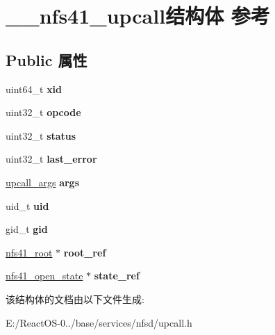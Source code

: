 \hypertarget{struct____nfs41__upcall}{}\section{\+\_\+\+\_\+nfs41\+\_\+upcall结构体 参考}
\label{struct____nfs41__upcall}
\subsection*{Public 属性}
\begin{DoxyCompactItemize}
\item 
\mbox{\label{struct____nfs41__upcall_ae69618353b07348ce9cd6065fea962a0}} 
uint64\+\_\+t {\bfseries xid}
\item 
\mbox{\label{struct____nfs41__upcall_ae81d7c243c723f4bc5918a72c860e406}} 
uint32\+\_\+t {\bfseries opcode}
\item 
\mbox{\label{struct____nfs41__upcall_a2c6587d8f6c9c4abd32bc2030bc5f8d6}} 
uint32\+\_\+t {\bfseries status}
\item 
\mbox{\label{struct____nfs41__upcall_aa3d42b20bdc8bcd6f9b02652b7d15b30}} 
uint32\+\_\+t {\bfseries last\+\_\+error}
\item 
\mbox{\label{struct____nfs41__upcall_aa1aa4310477283057506cd8ce6b94333}} 
\hyperlink{union____upcall__args}{upcall\+\_\+args} {\bfseries args}
\item 
\mbox{\label{struct____nfs41__upcall_a9da1b01f1009e8d5caf9be02a5bed235}} 
uid\+\_\+t {\bfseries uid}
\item 
\mbox{\label{struct____nfs41__upcall_af55446c65773be4422d396e74a7135f8}} 
gid\+\_\+t {\bfseries gid}
\item 
\mbox{\label{struct____nfs41__upcall_a818de6dcc6f2a9f9f7da653b77752d6a}} 
\hyperlink{struct____nfs41__root}{nfs41\+\_\+root} $\ast$ {\bfseries root\+\_\+ref}
\item 
\mbox{\label{struct____nfs41__upcall_a45f2c6f4723ed558b350bfe3bcd6dd6b}} 
\hyperlink{struct____nfs41__open__state}{nfs41\+\_\+open\+\_\+state} $\ast$ {\bfseries state\+\_\+ref}
\end{DoxyCompactItemize}


该结构体的文档由以下文件生成\+:\begin{DoxyCompactItemize}
\item 
E\+:/\+React\+O\+S-\/0../base/services/nfsd/upcall.\+h\end{DoxyCompactItemize}
